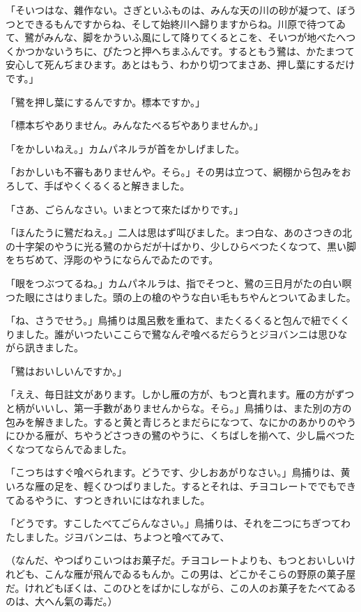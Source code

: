 \documentclass[tate,paper=b6j,jafontsize=9pt]{jlreq}
\begin{document}
「そいつはな、雜作ない。さぎといふものは、みんな天の川の砂が凝つて、ぼうつとできるもんですからね、そして始終川へ歸りますからね。川原で待つてゐて、鷺がみんな、脚をかういふ風にして降りてくるとこを、そいつが地べたへつくかつかないうちに、ぴたつと押へちまふんです。するともう鷺は、かたまつて安心して死んぢまひます。あとはもう、わかり切つてまさあ、押し葉にするだけです。」

「鷺を押し葉にするんですか。標本ですか。」

「標本ぢやありません。みんなたべるぢやありませんか。」

「をかしいねえ。」カムパネルラが首をかしげました。

「おかしいも不審もありませんや。そら。」その男は立つて、網棚から包みをおろして、手ばやくくるくると解きました。

「さあ、ごらんなさい。いまとつて來たばかりです。」

「ほんたうに鷺だねえ。」二人は思はず叫びました。まつ白な、あのさつきの北の十字架のやうに光る鷺のからだが十ばかり、少しひらべつたくなつて、黒い脚をちぢめて、浮彫のやうにならんでゐたのです。

「眼をつぶつてるね。」カムパネルラは、指でそつと、鷺の三日月がたの白い瞑つた眼にさはりました。頭の上の槍のやうな白い毛もちやんとついてゐました。

「ね、さうでせう。」鳥捕りは風呂敷を重ねて、またくるくると包んで紐でくくりました。誰がいつたいここらで鷺なんぞ喰べるだらうとジヨバンニは思ひながら訊きました。

「鷺はおいしいんですか。」

「ええ、毎日註文があります。しかし雁の方が、もつと賣れます。雁の方がずつと柄がいいし、第一手數がありませんからな。そら。」鳥捕りは、また別の方の包みを解きました。すると黄と青じろとまだらになつて、なにかのあかりのやうにひかる雁が、ちやうどさつきの鷺のやうに、くちばしを揃へて、少し扁べつたくなつてならんでゐました。

「こつちはすぐ喰べられます。どうです、少しおあがりなさい。」鳥捕りは、黄いろな雁の足を、輕くひつぱりました。するとそれは、チヨコレートででもできてゐるやうに、すつときれいにはなれました。

「どうです。すこしたべてごらんなさい。」鳥捕りは、それを二つにちぎつてわたしました。ジヨバンニは、ちよつと喰べてみて、

（なんだ、やつぱりこいつはお菓子だ。チヨコレートよりも、もつとおいしいけれども、こんな雁が飛んでゐるもんか。この男は、どこかそこらの野原の菓子屋だ。けれどもぼくは、このひとをばかにしながら、この人のお菓子をたべてゐるのは、大へん氣の毒だ。）
\end{document}
